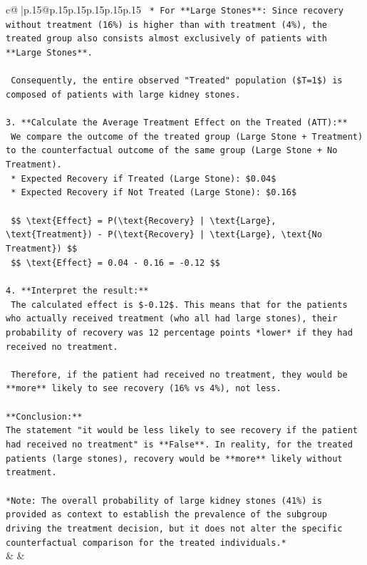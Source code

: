 \documentclass{article}
\begin{document}
{\begin{supertabular}{c@{$\;$}|p{.15\linewidth}@{}p{.15\linewidth}p{.15\linewidth}p{.15\linewidth}p{.15\linewidth}p{.15\linewidth}}
{{{\texttt{    *   For **Large Stones**: Since recovery without treatment (16\%) is higher than with treatment (4\%), the treated group also consists almost exclusively of patients with **Large Stones**.} \\
\\ 
\texttt{    Consequently, the entire observed "Treated" population (\$T=1\$) is composed of patients with large kidney stones.} \\
\\ 
\texttt{3.  **Calculate the Average Treatment Effect on the Treated (ATT):**} \\
\texttt{    We compare the outcome of the treated group (Large Stone + Treatment) to the counterfactual outcome of the same group (Large Stone + No Treatment).} \\
\texttt{    *   Expected Recovery if Treated (Large Stone): \$0.04\$} \\
\texttt{    *   Expected Recovery if Not Treated (Large Stone): \$0.16\$} \\
\\ 
\texttt{    \$\$ \textbackslash{}text\{Effect\} = P(\textbackslash{}text\{Recovery\} | \textbackslash{}text\{Large\}, \textbackslash{}text\{Treatment\}) {-} P(\textbackslash{}text\{Recovery\} | \textbackslash{}text\{Large\}, \textbackslash{}text\{No Treatment\}) \$\$} \\
\texttt{    \$\$ \textbackslash{}text\{Effect\} = 0.04 {-} 0.16 = {-}0.12 \$\$} \\
\\ 
\texttt{4.  **Interpret the result:**} \\
\texttt{    The calculated effect is \${-}0.12\$. This means that for the patients who actually received treatment (who all had large stones), their probability of recovery was 12 percentage points *lower* if they had received no treatment.} \\
\\ 
\texttt{    Therefore, if the patient had received no treatment, they would be **more** likely to see recovery (16\% vs 4\%), not less.} \\
\\ 
\texttt{**Conclusion:**} \\
\texttt{The statement "it would be less likely to see recovery if the patient had received no treatment" is **False**. In reality, for the treated patients (large stones), recovery would be **more** likely without treatment.} \\
\\ 
\texttt{*Note: The overall probability of large kidney stones (41\%) is provided as context to establish the prevalence of the subgroup driving the treatment decision, but it does not alter the specific counterfactual comparison for the treated individuals.*} \\
            }
        }
    }
    & & \\ \\


\end{supertabular}}
\end{document}
